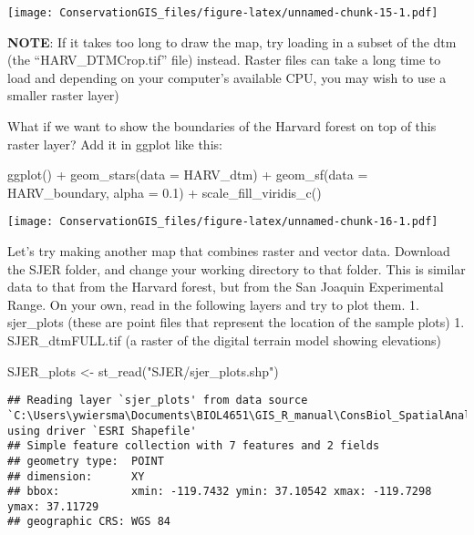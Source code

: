 \documentclass[
]{book}
\newenvironment{Shaded}{\begin{snugshade}}{\end{snugshade}}
\newcommand{\AttributeTok}[1]{\textcolor[rgb]{0.77,0.63,0.00}{#1}}
\newcommand{\FloatTok}[1]{\textcolor[rgb]{0.00,0.00,0.81}{#1}}
\newcommand{\FunctionTok}[1]{\textcolor[rgb]{0.00,0.00,0.00}{#1}}
\newcommand{\NormalTok}[1]{#1}
\newcommand{\OtherTok}[1]{\textcolor[rgb]{0.56,0.35,0.01}{#1}}
\newcommand{\SpecialCharTok}[1]{\textcolor[rgb]{0.00,0.00,0.00}{#1}}
\newcommand{\StringTok}[1]{\textcolor[rgb]{0.31,0.60,0.02}{#1}}
\begin{document}
\texttt{[image: ConservationGIS\_files/figure-latex/unnamed-chunk-15-1.pdf]}

\textbf{NOTE}: If it takes too long to draw the map, try loading in a subset of the dtm (the ``HARV\_DTMCrop.tif'' file) instead. Raster files can take a long time to load and depending on your computer's available CPU, you may wish to use a smaller raster layer)

What if we want to show the boundaries of the Harvard forest on top of this raster layer? Add it in ggplot like this:

\begin{Shaded}
\begin{Highlighting}[]
\FunctionTok{ggplot}\NormalTok{() }\SpecialCharTok{+}
  \FunctionTok{geom\_stars}\NormalTok{(}\AttributeTok{data =}\NormalTok{ HARV\_dtm) }\SpecialCharTok{+}
  \FunctionTok{geom\_sf}\NormalTok{(}\AttributeTok{data =}\NormalTok{ HARV\_boundary, }\AttributeTok{alpha =} \FloatTok{0.1}\NormalTok{) }\SpecialCharTok{+}
  \FunctionTok{scale\_fill\_viridis\_c}\NormalTok{()}
\end{Highlighting}
\end{Shaded}

\texttt{[image: ConservationGIS\_files/figure-latex/unnamed-chunk-16-1.pdf]}

Let's try making another map that combines raster and vector data. Download the SJER folder, and change your working directory to that folder. This is similar data to that from the Harvard forest, but from the San Joaquin Experimental Range. On your own, read in the following layers and try to plot them.
1. sjer\_plots (these are point files that represent the location of the sample plots)
1. SJER\_dtmFULL.tif (a raster of the digital terrain model showing elevations)

\begin{Shaded}
\begin{Highlighting}[]
\NormalTok{SJER\_plots }\OtherTok{\textless{}{-}} \FunctionTok{st\_read}\NormalTok{(}\StringTok{"SJER/sjer\_plots.shp"}\NormalTok{)}
\end{Highlighting}
\end{Shaded}

\begin{verbatim}
## Reading layer `sjer_plots' from data source `C:\Users\ywiersma\Documents\BIOL4651\GIS_R_manual\ConsBiol_SpatialAnalysis\SJER\sjer_plots.shp' using driver `ESRI Shapefile'
## Simple feature collection with 7 features and 2 fields
## geometry type:  POINT
## dimension:      XY
## bbox:           xmin: -119.7432 ymin: 37.10542 xmax: -119.7298 ymax: 37.11729
## geographic CRS: WGS 84
\end{verbatim}
\end{document}
